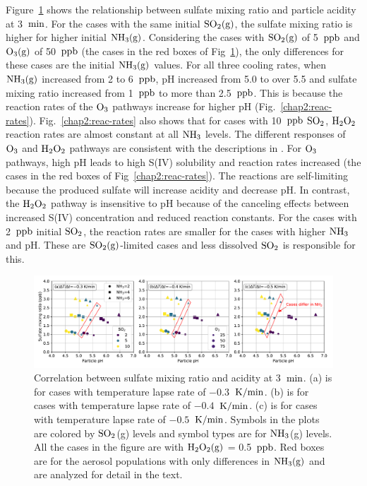 \documentclass[edeposit,fullpage]{uiucthesis2009}
\makeatletter
\DeclareRobustCommand*\unit[1]
 {\ensuremath{%
   {\thinmuskip3mu\relax
    \def\mu{\text{\textmu}}\def~{\,}%
    \ifx\f@series\testbx\mathbf{#1}\else\mathrm{#1}\fi}}}
\makeatother
\begin{document}
Figure~\ref{chap2:su-acidity} shows the relationship between sulfate
mixing ratio and particle acidity at 3~\unit{min}. For the cases with
the same initial $\rm SO_2(g)$, the sulfate mixing ratio is higher for
higher initial $\rm NH_3(g)$. Considering the cases with $\rm SO_2(g)$
of 5~\unit{ppb} and $\rm O_3(g)$ of 50~\unit{ppb} (the cases in the
red boxes of Fig~\ref{chap2:su-acidity}), the only differences for
these cases are the initial $\rm NH_3(g)$ values. For all three
cooling rates, when $\rm NH_3(g)$ increased from 2 to 6~\unit{ppb}, pH
increased from 5.0 to over 5.5 and sulfate mixing ratio increased from
1~\unit{ppb} to more than 2.5~\unit{ppb}. This is because the reaction
rates of the $\rm O_3$ pathways increase for higher pH
(Fig.~\ref{chap2:reac-rates}). Fig.~\ref{chap2:reac-rates} also shows
that for cases with 10~\unit{ppb} $\rm SO_2$, $\rm H_2O_2$ reaction
rates are almost constant at all $\rm NH_3$ levels. The different
responses of $\rm O_3$ and $\rm H_2O_2$ pathways are consistent with
the descriptions in \citet{Seinfeld2016}. For $\rm O_3$ pathways, high
pH leads to high S(IV) solubility and reaction rates increased (the
cases in the red boxes of Fig~\ref{chap2:reac-rates}). The reactions
are self-limiting because the produced sulfate will increase acidity
and decrease pH. In contrast, the $\rm H_2O_2$ pathway is insensitive
to pH because of the canceling effects between increased S(IV)
concentration and reduced reaction constants. For the cases with
2~\unit{ppb} initial $\rm SO_2$, the reaction rates are smaller for
the cases with higher $\rm NH_3$ and pH. These are $\rm
SO_2(g)$-limited cases and less dissolved $\rm SO_2$ is responsible
for this.

\begin{figure}[ht]
    \centering \includegraphics[scale=0.53]{chap2_figs/chap2_fig4_sulfate_pH_3min.pdf}
    \caption{Correlation between sulfate mixing ratio and acidity at
      3~\unit{min}. (a) is for cases with temperature lapse rate of
      $-0.3$~\unit{K/min}. (b) is for cases with temperature lapse
      rate of $-0.4$~\unit{K/min}. (c) is for cases with temperature
      lapse rate of $-0.5$~\unit{K/min}. Symbols in the plots are
      colored by $\rm SO_2$(g) levels and symbol types are for $\rm
      NH_3$(g) levels. All the cases in the figure are with $\rm
      H_2O_2(g)$ = 0.5~\unit{ppb}. Red boxes are for the aerosol
      populations with only differences in $\rm NH_3(g)$ and are
      analyzed for detail in the text.}
    \label{chap2:su-acidity}
\end{figure}
\end{document}
